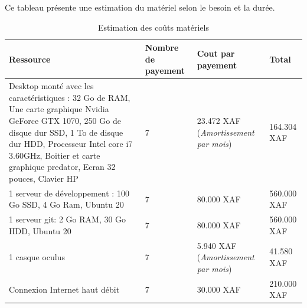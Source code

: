 Ce tableau présente une estimation du matériel selon le besoin et la durée.

\begin{table}[H]
	\caption{Estimation des coûts matériels}

	\begin{tabular}{ |p{7cm}|p{2cm}|p{3cm}|p{3cm}| }
		\hline
		\textbf{Ressource}                                                                                                                                                                                                                                     & \textbf{Nombre de payement} & \textbf{Cout par payement}                   & \textbf{Total} \\
		\hline
		Desktop monté avec les caractéristiques : 32 Go de RAM, Une carte graphique Nvidia GeForce GTX 1070, 250 Go de disque dur SSD, 1 To de disque dur HDD, Processeur Intel core i7 3.60GHz, Boitier et carte graphique predator, Ecran 32 pouces, Clavier HP & 7                           & 23.472 XAF (\textit{Amortissement par mois}) & 164.304 XAF    \\
		\hline
		1 serveur de développement : 100 Go SSD, 4 Go Ram, Ubuntu 20                                                                                                                                                                                           & 7                           & 80.000 XAF                                   & 560.000 XAF    \\
		\hline
		1 serveur git: 2 Go RAM, 30 Go HDD, Ubuntu 20                                                                                                                                                                                                           & 7                           & 80.000 XAF                                   & 560.000 XAF    \\
		\hline
		1 casque oculus                                                                                                                                                                                                                                        & 7                           & 5.940 XAF (\textit{Amortissement par mois})  & 41.580 XAF     \\
		\hline
		Connexion Internet haut débit                                                                                                                                                                                                                          & 7                           & 30.000 XAF                                   & 210.000 XAF    \\

\end{tabular}
\end{table}
